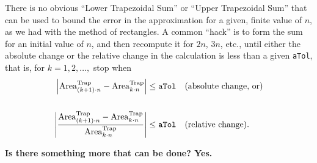 \begin{rem}
    There is no obvious ``Lower Trapezoidal Sum'' or   ``Upper Trapezoidal Sum'' that can be used to bound the error in the approximation for a given, finite value of $n$, as we had with the method of rectangles. A common ``hack'' is to form the sum for an initial value of $n$, and then recompute it for $2 n$, $3n$, etc., until either the absolute change or the relative change in the calculation is less than a given \texttt{aTol}, that is, for $k=1, 2, \ldots,$ stop when
\begin{align*}
\left| {\rm Area}^{\rm Trap}_{(k+1)\cdot n} -  {\rm Area}^{\rm Trap}_{k \cdot n}  \right| & \le \texttt{aTol} ~~~(\text{absolute change, or})\\
\\
\left|  \frac{ {\rm Area}^{\rm Trap}_{(k+1)\cdot n} -  {\rm Area}^{\rm Trap}_{k \cdot n} }{{\rm Area}^{\rm Trap}_{k \cdot n} } \right| & \le \texttt{aTol} ~~~(\text{relative change}).    
\end{align*}

\begin{center}
\setlength{\fboxrule}{2pt}  %
\end{center}
 
\end{rem} 

\bigskip

\textbf{Is there something more that can be done? Yes. }

